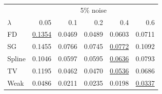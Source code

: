 \begin{tabular}{l|rrrrr}\toprule
 & \multicolumn{5}{c}{5\% noise} \\
$\lambda$ & 0.05 & 0.1 & 0.2 & 0.4 & 0.6 \\\midrule
FD & \underline{0.1354} & \colorbox{black!15}{0.0469} & 0.0489 & 0.0603 & 0.0711 \\
SG & 0.1455 & 0.0766 & 0.0745 & \colorbox{black!15}{\underline{0.0772}} & 0.1092 \\
Spline & 0.1046 & 0.0597 & 0.0595 & \colorbox{black!15}{\underline{0.0636}} & 0.0793 \\
TV & 0.1195 & 0.0462 & 0.0470 & \colorbox{black!15}{\underline{0.0536}} & 0.0686 \\
Weak & 0.0486 & 0.0211 & 0.0235 & 0.0198 & \colorbox{black!15}{\underline{0.0337}} \\
\bottomrule\end{tabular}
